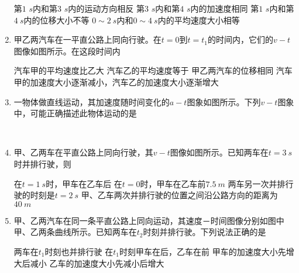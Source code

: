\begin{enumerate}[leftmargin=0em]
\fourchoices
{第$ 1 $ $ s $内和第$ 3 $ $ s $内的运动方向相反}
{第$ 3 $ $ s $内和第$ 4 $ $ s $内的加速度相同}
{第$ 1 $ $ s $内和第$ 4 \ s $内的位移大小不等}
{$ 0 \sim 2 \ s $内和$ 0 \sim 4 \ s $内的平均速度大小相等}





\item 
{}
甲乙两汽车在一平直公路上同向行驶。在$ t=0 $到$ t=t_1 $的时间内，它们的$ v-t $图像如图所示。在这段时间内  
\begin{figure}[h!]
\centering

\end{figure}

\fourchoices
{汽车甲的平均速度比乙大}
{汽车乙的平均速度等于}
{甲乙两汽车的位移相同}
{汽车甲的加速度大小逐渐减小，汽车乙的加速度大小逐渐增大}

\item 
{}
一物体做直线运动，其加速度随时间变化的$ a-t $图象如图所示。下列$ v-t $图象中，可能正确描述此物体运动的是  
\begin{figure}[h!]
\centering
\\

\end{figure}



\item 
{}
甲、乙两车在平直公路上同向行驶，其$ v-t $图像如图所示。已知两车在$ t=3 \ s $时并排行驶，则  
\begin{figure}[h!]
\centering

\end{figure}


\fourchoices
{在$ t=1 \ s $时，甲车在乙车后}
{在$ t=0 $时，甲车在乙车前$ 7.5\ m $}
{两车另一次并排行驶的时刻是$ t=2 \ s $}
{甲、乙车两次并排行驶的位置之间沿公路方向的距离为$ 40 \ m $}

\item 
{}
甲、乙两汽车在同一条平直公路上同向运动，其速度－时间图像分别如图中甲、乙两条曲线所示。已知两车在$ t_{2} $时刻并排行驶。下列说法正确的是  
\begin{figure}[h!]
\centering

\end{figure}


\fourchoices
{两车在$ t_{1} $时刻也并排行驶}
{在$ t_{1} $时刻甲车在后，乙车在前}
{甲车的加速度大小先增大后减小}
{乙车的加速度大小先减小后增大}



\end{enumerate}
